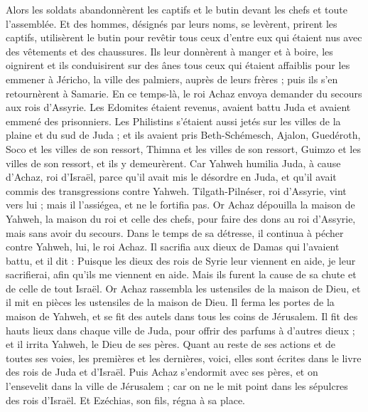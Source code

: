 \begin{multicols}{2}
Alors les soldats abandonnèrent les captifs et le butin devant les chefs et toute l'assemblée.
Et des hommes, désignés par leurs noms, se levèrent, prirent les captifs, utilisèrent le butin pour revêtir tous ceux d'entre eux qui étaient nus avec des vêtements et des chaussures. Ils leur donnèrent à manger et à boire, les oignirent et ils conduisirent sur des ânes tous ceux qui étaient affaiblis pour les emmener à Jéricho, la ville des palmiers, auprès de leurs frères ; puis ils s'en retournèrent à Samarie.
En ce temps-là, le roi Achaz envoya demander du secours aux rois d'Assyrie.
Les Edomites étaient revenus, avaient battu Juda et avaient emmené des prisonniers.
Les Philistins s'étaient aussi jetés sur les villes de la plaine et du sud de Juda ; et ils avaient pris Beth-Schémesch, Ajalon, Guedéroth, Soco et les villes de son ressort, Thimna et les villes de son ressort, Guimzo et les villes de son ressort, et ils y demeurèrent.
Car Yahweh humilia Juda, à cause d'Achaz, roi d'Israël, parce qu'il avait mis le désordre en Juda, et qu'il avait commis des transgressions contre Yahweh.
Tilgath-Pilnéser, roi d'Assyrie, vint vers lui ; mais il l'assiégea, et ne le fortifia pas.
Or Achaz dépouilla la maison de Yahweh, la maison du roi et celle des chefs, pour faire des dons au roi d'Assyrie, mais sans avoir du secours.
Dans le temps de sa détresse, il continua à pécher contre Yahweh, lui, le roi Achaz.
Il sacrifia aux dieux de Damas qui l'avaient battu, et il dit : Puisque les dieux des rois de Syrie leur viennent en aide, je leur sacrifierai, afin qu'ils me viennent en aide. Mais ils furent la cause de sa chute et de celle de tout Israël.
Or Achaz rassembla les ustensiles de la maison de Dieu, et il mit en pièces les ustensiles de la maison de Dieu. Il ferma les portes de la maison de Yahweh, et se fit des autels dans tous les coins de Jérusalem.
Il fit des hauts lieux dans chaque ville de Juda, pour offrir des parfums à d'autres dieux ; et il irrita Yahweh, le Dieu de ses pères.
Quant au reste de ses actions et de toutes ses voies, les premières et les dernières, voici, elles sont écrites dans le livre des rois de Juda et d'Israël.
Puis Achaz s'endormit avec ses pères, et on l'ensevelit dans la ville de Jérusalem ; car on ne le mit point dans les sépulcres des rois d'Israël. Et Ezéchias, son fils, régna à sa place.

\end{multicols}
